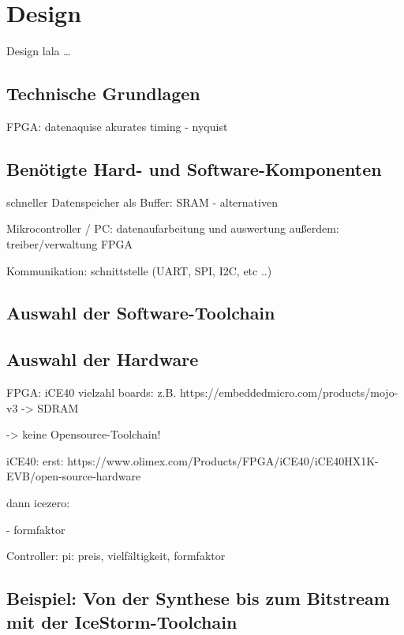 \chapter{Design}
\label{ch:Design}
Design lala \ldots

\section{Technische Grundlagen}
FPGA: datenaquise akurates timing
	- nyquist

\clearpage
\section{Benötigte Hard- und Software-Komponenten}
schneller Datenspeicher als Buffer: SRAM 
	- alternativen

Mikrocontroller / PC: datenaufarbeitung und auswertung
	außerdem: treiber/verwaltung FPGA

Kommunikation: schnittstelle (UART, SPI, I2C, etc ..)
\clearpage

\section{Auswahl der Software-Toolchain}
\clearpage

\section{Auswahl der Hardware}

FPGA: iCE40
vielzahl boards:
	z.B. https://embeddedmicro.com/products/mojo-v3
	-> SDRAM

	-> keine Opensource-Toolchain!

iCE40:
	erst:
	https://www.olimex.com/Products/FPGA/iCE40/iCE40HX1K-EVB/open-source-hardware

	dann icezero:

	- formfaktor


Controller:
	pi: preis, vielfältigkeit, formfaktor

\clearpage

\section{Beispiel: Von der Synthese bis zum Bitstream mit der IceStorm-Toolchain}
\clearpage


